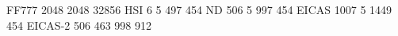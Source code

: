 FF777 2048 2048 32856
HSI        6    5  497  454
ND       506    5  997  454
EICAS   1007    5 1449  454
EICAS-2  506  463  998  912
